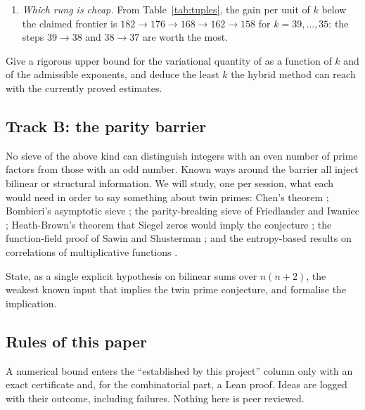 \begin{enumerate}
from a good positive test function $F$ is the natural candidate). For the
one-band hybrid supports of \cite{Sta26,Cha26},
Theorem~\ref{thm:hybrid-floor} gives the first such bound we know of
($k\ge29$ at Stadlmann's level, $k\ge27$ at that of \cite{Cha26}), still
far from $49$ and $45$; it ignores the caps. A rigorous
dual certificate there would say whether $182$ is close to the limit of the
present inputs or far from it, and which input (which Type~I/II/III range) is
binding.
\item \emph{Which rung is cheap.} From Table~\ref{tab:tuples}, the gain per
unit of $k$ below the claimed frontier is $182\to176\to168\to162\to158$
for $k=39,\dots,35$: the steps $39\to38$ and $38\to37$ are worth the most.
\end{enumerate}

\begin{problem}
Give a rigorous upper bound for the variational quantity of \cite{Sta26} as a
function of $k$ and of the admissible exponents, and deduce the least $k$ the
hybrid method can reach with the currently proved estimates.
\end{problem}

\subsection*{Track B: the parity barrier}
No sieve of the above kind can distinguish integers with an even number of
prime factors from those with an odd number. Known ways around the barrier
all inject bilinear or structural information. We will study, one per
session, what each would need in order to say something about twin primes:
Chen's theorem \cite{Che73}; Bombieri's asymptotic sieve \cite{Bom76}; the
parity-breaking sieve of Friedlander and Iwaniec \cite{FI98}; Heath-Brown's
theorem that Siegel zeros would imply the conjecture \cite{HB83}; the
function-field proof of Sawin and Shusterman \cite{SS22}; and the
entropy-based results on correlations of multiplicative functions
\cite{Tao16}.

\begin{problem}
State, as a single explicit hypothesis on bilinear sums over $n(n+2)$, the
weakest known input that implies the twin prime conjecture, and formalise the
implication.
\end{problem}

\subsection*{Rules of this paper}
A numerical bound enters the ``established by this project'' column only with
an exact certificate and, for the combinatorial part, a Lean proof. Ideas are
logged with their outcome, including failures. Nothing here is peer reviewed.

